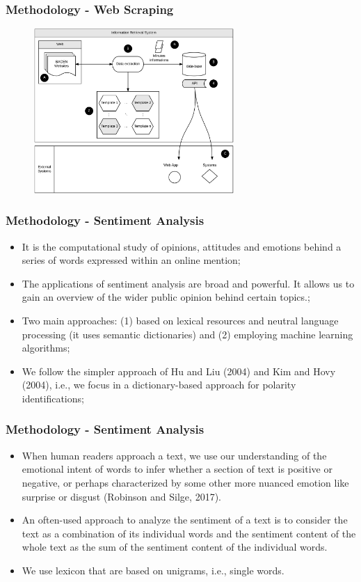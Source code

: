 \documentclass[aspectratio=169]{beamer}
\begin{document}
\begin{frame}\frametitle{Methodology - Web Scraping}
  \begin{figure}[hb]
  \includegraphics[width=3in]{minutes_crawler_diagram.png}
  \label{fig01}
  \end{figure}
\end{frame}

\begin{frame}\frametitle{Methodology - Sentiment Analysis}
  \begin{itemize}
  	\item It is the computational study of opinions, attitudes and emotions behind a series of words expressed within an online mention;
    \item The applications of sentiment analysis are broad and powerful. It allows us to gain an overview of the wider public opinion behind certain topics.;
    \item Two main approaches: (1) based on lexical resources and neutral language processing (it uses semantic dictionaries) and (2) employing machine learning algorithms;
    \item We follow the simpler approach of Hu and Liu (2004) and Kim and Hovy (2004), i.e., we focus in a dictionary-based approach for polarity identifications;
    \end{itemize}
\end{frame}

\begin{frame}\frametitle{Methodology - Sentiment Analysis}
\begin{itemize}
	\item When human readers approach a text, we use our understanding of the emotional intent of words to infer whether a section of text is positive or negative, or perhaps characterized by some other more nuanced emotion like surprise or disgust (Robinson and Silge, 2017).
	\item An often-used approach to analyze the sentiment of a text is to consider the text as a combination of its individual words and the sentiment content of the whole text as the sum of the sentiment content of the individual words. 
	\item We use lexicon that are based on unigrams, i.e., single words. 
\end{itemize}
\end{frame}
\end{document}
